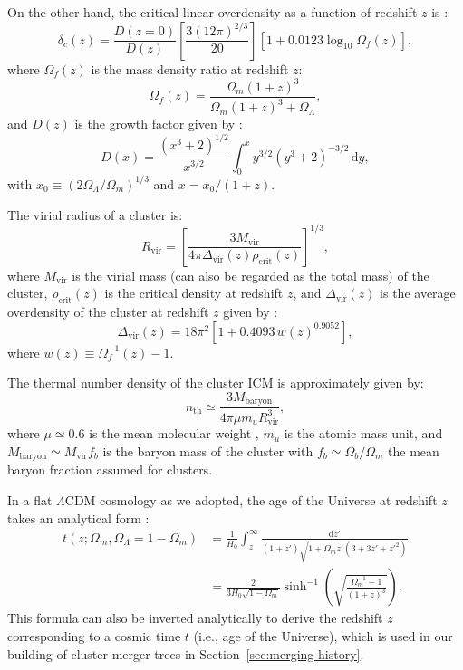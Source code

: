 \documentclass[modern]{aastex61}
\newcommand{\R}[1]{\mathrm{#1}}
\newcommand{\D}[1]{\R{d} #1}
\newcommand{\lcdm}{$\Lambda$CDM}
\begin{document}
On the other hand, the critical linear overdensity as a function of
redshift $z$ is \citep{kitayama1996,randall2002}:
\begin{equation}
  \label{eq:delta-crit}
  \delta_c(z) = \frac{D(z=0)}{D(z)}
  \left[ \frac{3 (12\pi)^{2/3}}{20} \right]
  \left[1 + 0.0123 \log_{10} \Omega_f(z) \right],
\end{equation}
where $\Omega_f(z)$ is the mass density ratio at redshift $z$:
\begin{equation}
  \label{eq:omega-fz}
  \Omega_f(z) = \frac{\Omega_m(1+z)^3}{\Omega_m(1+z)^3 + \Omega_{\Lambda}},
\end{equation}
and $D(z)$ is the growth factor given by
\citep[Equation~(13.6)]{peebles1980}:
\begin{equation}
  \label{eq:growth-factor}
  D(x) = \frac{(x^3 + 2)^{1/2}}{x^{3/2}}
    \int_0^x y^{3/2} (y^3 + 2)^{-3/2} \,\D{y},
\end{equation}
with $x_0 \equiv (2\Omega_{\Lambda}/\Omega_m)^{1/3}$ and
$x = x_0 / (1+z)$.

The virial radius of a cluster is:
\begin{equation}
  \label{eq:radius-virial}
  R_{\R{vir}} = \left[
    \frac{3 M_{\R{vir}}}{4\pi \Delta_{\R{vir}}(z) \rho_{\R{crit}}(z)}
  \right]^{1/3},
\end{equation}
where $M_{\R{vir}}$ is the virial mass (can also be regarded as
the total mass) of the cluster,
$\rho_{\R{crit}}(z)$ is the critical density at redshift $z$,
and $\Delta_{\R{vir}}(z)$ is the average overdensity of the cluster
at redshift $z$ given by \citep{kitayama1996,cassano2005}:
\begin{equation}
  \label{eq:delta-vir}
  \Delta_{\R{vir}}(z) = 18\pi^2 \left[ 1 + 0.4093 \, w(z)^{0.9052} \right],
\end{equation}
where $w(z) \equiv \Omega_f^{-1}(z) - 1$.

The thermal number density of the cluster ICM is approximately given by:
\begin{equation}
  \label{eq:nth}
  n_{\R{th}} \simeq
    \frac{3 M_{\R{baryon}}}{4\pi \mu m_u R_{\R{vir}}^3},
\end{equation}
where $\mu \simeq 0.6$ is the mean molecular weight \citep{ettori2013},
$m_u$ is the atomic mass unit,
and $M_{\R{baryon}} \simeq M_{\R{vir}} f_b$ is the baryon mass
of the cluster with $f_b \simeq \Omega_b / \Omega_m$ the mean baryon
fraction assumed for clusters.

In a flat \lcdm{} cosmology as we adopted, the age of the Universe
at redshift $z$ takes an analytical form
\citep[their Equation~(18)]{thomas2000}:
\begin{align}
  \label{eq:universe-age}
  t(z; \Omega_m, \Omega_{\Lambda}=1-\Omega_m)
    & = \frac{1}{H_0} \int_z^{\infty}
      \frac{\D{z'}}{(1+z')\sqrt{1 + \Omega_m z' (3+3z'+z'^2)}} \nonumber \\
    & = \frac{2}{3 H_0 \sqrt{1-\Omega_m}} \sinh^{-1} \!\left(
      \sqrt{\frac{\Omega_m^{-1} - 1}{(1+z)^3}} \right).
\end{align}
This formula can also be inverted analytically to derive the redshift
$z$ corresponding to a cosmic time $t$ (i.e., age of the Universe),
which is used in our building of cluster merger trees
in Section~\ref{sec:merging-history}.
\end{document}
